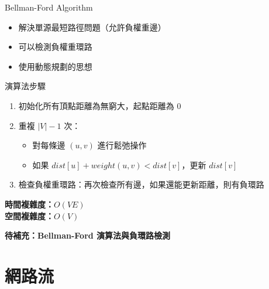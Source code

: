 \documentclass{beamer}
\begin{document}
\begin{frame}{Bellman-Ford Algorithm}
\begin{itemize}
    \item 解決單源最短路徑問題（允許負權重邊）
    \item 可以檢測負權重環路
    \item 使用動態規劃的思想
\end{itemize}

\vspace{1em}
\begin{block}{演算法步驟}
\begin{enumerate}
    \item 初始化所有頂點距離為無窮大，起點距離為 0
    \item 重複 $|V| - 1$ 次：
    \begin{itemize}
        \item 對每條邊 $(u, v)$ 進行鬆弛操作
        \item 如果 $dist[u] + weight(u,v) < dist[v]$，更新 $dist[v]$
    \end{itemize}
    \item 檢查負權重環路：再次檢查所有邊，如果還能更新距離，則有負環路
\end{enumerate}
\end{block}

\vspace{1em}
\textbf{時間複雜度：}$O(VE)$\\
\textbf{空間複雜度：}$O(V)$

\vspace{1em}
\textbf{待補充：Bellman-Ford 演算法與負環路檢測}
\end{frame}

\section{網路流}
\end{document}
